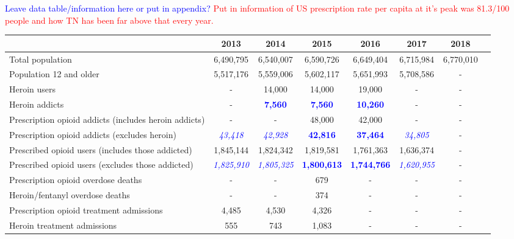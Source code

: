 \documentclass[12pt]{article}
\begin{document}
\textcolor{blue}{Leave data table/information here or put in appendix?}
\textcolor{red}{Put in information of US prescription rate per capita at it's peak was 81.3/100 people and how TN has been far above that every year.}
\begin{tabular}{|l|c|c|c|c|c|c|l}
\hline
 & \footnotesize{2013} & \footnotesize{2014} & \footnotesize{2015} & \footnotesize{2016} & \footnotesize{2017} & \footnotesize{2018}\\
\hline
\footnotesize
Total population & \footnotesize{6,490,795} & \footnotesize{6,540,007} & \footnotesize{6,590,726} & \footnotesize{6,649,404} & \footnotesize{6,715,984} & \footnotesize{6,770,010}\\
\footnotesize
Population 12 and older & \footnotesize{5,517,176} & \footnotesize{5,559,006} & \footnotesize{5,602,117} & \footnotesize{5,651,993} & \footnotesize{5,708,586} & -\\
\footnotesize
Heroin users& - &\footnotesize{14,000} & \footnotesize{14,000} & \footnotesize{19,000}  & - &-\\
\footnotesize
Heroin addicts & - &\footnotesize{\textcolor{blue}{\textbf{7,560}}} & \footnotesize{\textcolor{blue}{\textbf{7,560}}} & \footnotesize{\textcolor{blue}{\textbf{10,260}}}  & - &-\\
\footnotesize
Prescription opioid addicts (includes heroin addicts) & - &  - & \footnotesize{48,000}
& \footnotesize{42,000} & - &-\\
\footnotesize
Prescription opioid addicts (excludes heroin) & \footnotesize{\textit{\textcolor{blue}{43,418}}} & \footnotesize{\textit{\textcolor{blue}{42,928}}} & \footnotesize{\textcolor{blue}{\textbf{42,816}}
} & \footnotesize{\textcolor{blue}{\textbf{37,464}}} & \footnotesize{\textit{\textcolor{blue}{34,805}}} &-\\
\footnotesize
Prescribed opioid users (includes those addicted) & \footnotesize{1,845,144} &\footnotesize{1,824,342} & \footnotesize{1,819,581} & \footnotesize{1,761,363} &  \footnotesize{1,636,374} &-\\
\footnotesize
Prescribed opioid users (excludes those addicted)   & \footnotesize{\textit{\textcolor{blue}{1,825,910}}} &\footnotesize{\textit{\textcolor{blue}{1,805,325}
}} & \footnotesize{\textcolor{blue}{\textbf{1,800,613}}} & \footnotesize{\textcolor{blue}{\textbf{1,744,766}}} &  \footnotesize{\textit{\textcolor{blue}{1,620,955}
}} &-\\
\footnotesize
Prescription opioid overdose deaths & - & - & \footnotesize{679} & -  & - &-\\
\footnotesize
Heroin/fentanyl overdose deaths & - & - & \footnotesize{374} & -  & - &-\\
\footnotesize
Prescription opioid treatment admissions & \footnotesize{4,485} & \footnotesize{4,530} & \footnotesize{4,326} & -  & - &-\\
\footnotesize
Heroin treatment admissions & \footnotesize{555} & \footnotesize{743} & \footnotesize{1,083} & -  & - &-\\
\hline
\end{tabular} \\
\end{document}
